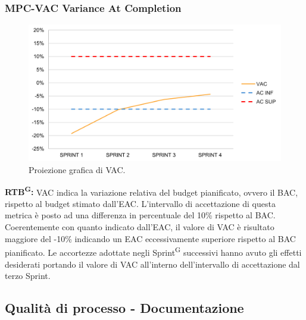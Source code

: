 \documentclass[8pt]{article}
\newcommand{\glossterm}[1]{#1\textsuperscript{G}} %
\begin{document}
\subsubsection{MPC-VAC Variance At Completion}
\begin{figure}[h!]
    \centering
    \includegraphics[width=1\textwidth]{images/VAC.png}
    \caption{Proiezione grafica di VAC.}
    \label{fig:Proiezione grafica di VAC}
\end{figure}
\textbf{\glossterm{RTB}:} VAC indica la variazione relativa del budget pianificato, ovvero il BAC, rispetto al budget stimato dall'EAC. L'intervallo di accettazione di questa metrica è posto ad una differenza in percentuale del 10\% rispetto al BAC.\\
Coerentemente con quanto indicato dall'EAC, il valore di VAC è risultato maggiore del -10\% indicando un EAC eccessivamente superiore rispetto al BAC pianificato. Le accortezze adottate negli \glossterm{Sprint} successivi hanno avuto gli effetti desiderati portando il valore di VAC all'interno dell'intervallo di accettazione dal terzo Sprint.
\clearpage
\subsection{Qualità di processo - Documentazione}
\end{document}
